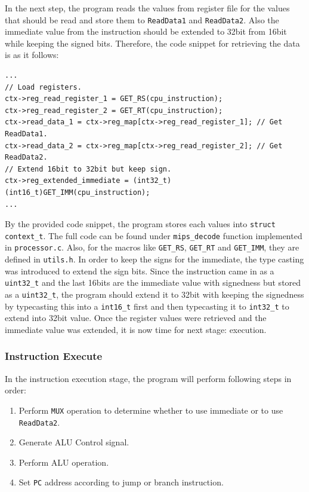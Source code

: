 \documentclass{homework}
\begin{document}
In the next step, the program reads the values from register file for the values that should be read and store them to \texttt{ReadData1} and \texttt{ReadData2}. Also the immediate value from the instruction should be extended to 32bit from 16bit while keeping the signed bits. Therefore, the code snippet for retrieving the data is as it follows:
\\
\begin{center}
\begin{code}
\begin{verbatim}
...
// Load registers.
ctx->reg_read_register_1 = GET_RS(cpu_instruction);
ctx->reg_read_register_2 = GET_RT(cpu_instruction);
ctx->read_data_1 = ctx->reg_map[ctx->reg_read_register_1]; // Get ReadData1.
ctx->read_data_2 = ctx->reg_map[ctx->reg_read_register_2]; // Get ReadData2.
// Extend 16bit to 32bit but keep sign.
ctx->reg_extended_immediate = (int32_t)(int16_t)GET_IMM(cpu_instruction);
...
\end{verbatim}
\end{code}
\end{center}

By the provided code snippet, the program stores each values into \texttt{struct context_t}. The full code can be found under \texttt{mips_decode} function implemented in \texttt{processor.c}. Also, for the macros like \texttt{GET_RS}, \texttt{GET_RT} and \texttt{GET_IMM}, they are defined in \texttt{utils.h}. In order to keep the signs for the immediate, the type casting was introduced to extend the sign bits. Since the instruction came in as a \texttt{uint32_t} and the last 16bits are the immediate value with signedness but stored as a \texttt{uint32_t}, the program should extend it to 32bit with keeping the signedness by typecasting this into a \texttt{int16_t} first and then typecasting it to \texttt{int32_t} to extend into 32bit value. Once the register values were retrieved and the immediate value was extended, it is now time for next stage: execution.

\pagebreak
\subsubsection{Instruction Execute}
In the instruction execution stage, the program will perform following steps in order:
\begin{enumerate}
    \item Perform \texttt{MUX} operation to determine whether to use immediate or to use \texttt{ReadData2}.
    \item Generate ALU Control signal.
    \item Perform ALU operation.
    \item Set \texttt{PC} address according to jump or branch instruction.
\end{enumerate}
\end{document}
